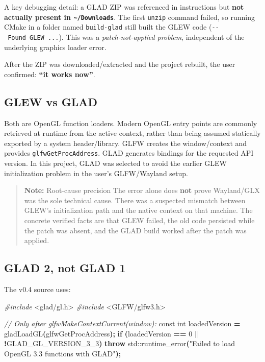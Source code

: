 \documentclass[
  10pt,
  a4paper,
]{article}
\newenvironment{Shaded}{\begin{snugshade}}{\end{snugshade}}
\newcommand{\AttributeTok}[1]{\textcolor[rgb]{0.13,0.29,0.53}{#1}}
\newcommand{\BuiltInTok}[1]{#1}
\newcommand{\CommentTok}[1]{\textcolor[rgb]{0.56,0.35,0.01}{\textit{#1}}}
\newcommand{\ControlFlowTok}[1]{\textcolor[rgb]{0.13,0.29,0.53}{\textbf{#1}}}
\newcommand{\DataTypeTok}[1]{\textcolor[rgb]{0.13,0.29,0.53}{#1}}
\newcommand{\DecValTok}[1]{\textcolor[rgb]{0.00,0.00,0.81}{#1}}
\newcommand{\ImportTok}[1]{#1}
\newcommand{\NormalTok}[1]{#1}
\newcommand{\OperatorTok}[1]{\textcolor[rgb]{0.81,0.36,0.00}{\textbf{#1}}}
\newcommand{\PreprocessorTok}[1]{\textcolor[rgb]{0.56,0.35,0.01}{\textit{#1}}}
\newcommand{\StringTok}[1]{\textcolor[rgb]{0.31,0.60,0.02}{#1}}
\begin{document}
A key debugging detail: a GLAD ZIP was referenced in instructions but
\textbf{not actually present in \texttt{\textasciitilde{}/Downloads}}.
The first \texttt{unzip} command failed, so running CMake in a folder
named \texttt{build-glad} still built the GLEW code
(\texttt{-\/-\ Found\ GLEW\ ...}). This was a \emph{patch-not-applied
problem}, independent of the underlying graphics loader error.

After the ZIP was downloaded/extracted and the project rebuilt, the user
confirmed: \textbf{``it works now''}.

\subsection{GLEW vs GLAD}\label{glew-vs-glad}

Both are OpenGL function loaders. Modern OpenGL entry points are
commonly retrieved at runtime from the active context, rather than being
assumed statically exported by a system header/library. GLFW creates the
window/context and provides \texttt{glfwGetProcAddress}. GLAD generates
bindings for the requested API version. In this project, GLAD was
selected to avoid the earlier GLEW initialization problem in the user's
GLFW/Wayland setup.

\begin{quote}
\textbf{Note:} Root-cause precision The error alone does \textbf{not}
prove Wayland/GLX was the sole technical cause. There was a suspected
mismatch between GLEW's initialization path and the native context on
that machine. The concrete verified facts are that GLEW failed, the old
code persisted while the patch was absent, and the GLAD build worked
after the patch was applied.
\end{quote}

\subsection{GLAD 2, not GLAD 1}\label{glad-2-not-glad-1}

The v0.4 source uses:

\begin{Shaded}
\begin{Highlighting}[]
\PreprocessorTok{\#include }\ImportTok{\textless{}glad/gl.h\textgreater{}}
\PreprocessorTok{\#include }\ImportTok{\textless{}GLFW/glfw3.h\textgreater{}}

\CommentTok{// Only after glfwMakeContextCurrent(window):}
\AttributeTok{const} \DataTypeTok{int}\NormalTok{ loadedVersion }\OperatorTok{=}\NormalTok{ gladLoadGL}\OperatorTok{(}\NormalTok{glfwGetProcAddress}\OperatorTok{);}
\ControlFlowTok{if} \OperatorTok{(}\NormalTok{loadedVersion }\OperatorTok{==} \DecValTok{0} \OperatorTok{||} \OperatorTok{!}\NormalTok{GLAD\_GL\_VERSION\_3\_3}\OperatorTok{)}
    \ControlFlowTok{throw} \BuiltInTok{std::}\NormalTok{runtime\_error}\OperatorTok{(}\StringTok{"Failed to load OpenGL 3.3 functions with GLAD"}\OperatorTok{);}
\end{Highlighting}
\end{Shaded}
\end{document}
